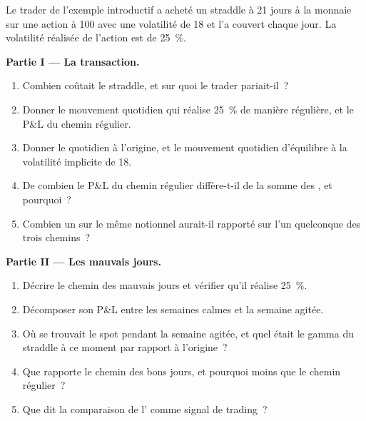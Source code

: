 \begin{problem}\label{pb:dv:trading-volatility:1}
Le trader de l'exemple introductif a acheté un straddle à 21 jours à la monnaie sur une action à 100 avec une volatilité de 18 et l'a couvert chaque jour. La volatilité réalisée de l'action est de 25~\%.

\medskip\noindent\textbf{Partie I --- La transaction.}
\begin{enumerate}
\item Combien coûtait le straddle, et sur quoi le trader pariait-il~?
\item Donner le mouvement quotidien qui réalise 25~\% de manière régulière, et le P\&L du chemin régulier.
\item Donner le  quotidien à l'origine, et le mouvement quotidien d'équilibre à la volatilité implicite de 18.
\item De combien le P\&L du chemin régulier diffère-t-il de la somme des , et pourquoi~?
\item Combien un  sur le même notionnel aurait-il rapporté sur l'un quelconque des trois chemins~?
\end{enumerate}

\medskip\noindent\textbf{Partie II --- Les mauvais jours.}
\begin{enumerate}[resume]
\item Décrire le chemin des mauvais jours et vérifier qu'il réalise 25~\%.
\item Décomposer son P\&L entre les semaines calmes et la semaine agitée.
\item Où se trouvait le spot pendant la semaine agitée, et quel était le gamma du straddle à ce moment par rapport à l'origine~?
\item Que rapporte le chemin des bons jours, et pourquoi moins que le chemin régulier~?
\item Que dit la comparaison de l' comme signal de trading~?
\end{enumerate}


\end{problem}
